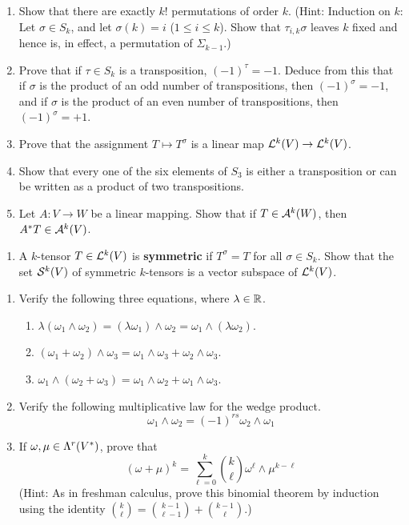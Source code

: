 \documentclass[../psets.tex]{subfiles}
\begin{document}
\begin{enumerate}[label={\textbf{1.4.\roman*.}}]
    \item Show that there are exactly $k!$ permutations of order $k$. (Hint: Induction on $k$: Let $\sigma\in S_k$, and let $\sigma(k)=i$ ($1\leq i\leq k$). Show that $\tau_{i,k}\sigma$ leaves $k$ fixed and hence is, in effect, a permutation of $\Sigma_{k-1}$.)
    \item Prove that if $\tau\in S_k$ is a transposition, $(-1)^\tau=-1$. Deduce from this that if $\sigma$ is the product of an odd number of transpositions, then $(-1)^\sigma=-1$, and if $\sigma$ is the product of an even number of transpositions, then $(-1)^\sigma=+1$.
    \item Prove that the assignment $T\mapsto T^\sigma$ is a linear map $\lin[k]{V}\to\lin[k]{V}$.
    \setcounter{enumi}{5}
    \item Show that every one of the six elements of $S_3$ is either a transposition or can be written as a product of two transpositions.
    \setcounter{enumi}{8}
    \item Let $A:V\to W$ be a linear mapping. Show that if $T\in\alt[k]{W}$, then $A^*T\in\alt[k]{V}$.
\end{enumerate}
\begin{enumerate}[label={\textbf{1.5.\roman*.}}]
    \item A $k$-tensor $T\in\lin[k]{V}$ is \textbf{symmetric} if $T^\sigma=T$ for all $\sigma\in S_k$. Show that the set $\sym[k]{V}$ of symmetric $k$-tensors is a vector subspace of $\lin[k]{V}$.
\end{enumerate}
\begin{enumerate}[label={\textbf{1.6.\roman*.}}]
    \item Verify the following three equations, where $\lambda\in\R$.
    \begin{enumerate}
        \item $\lambda(\omega_1\wedge\omega_2)=(\lambda\omega_1)\wedge\omega_2=\omega_1\wedge(\lambda\omega_2)$.
        \item $(\omega_1+\omega_2)\wedge\omega_3=\omega_1\wedge\omega_3+\omega_2\wedge\omega_3$.
        \item $\omega_1\wedge(\omega_2+\omega_3)=\omega_1\wedge\omega_2+\omega_1\wedge\omega_3$.
    \end{enumerate}
    \item Verify the following multiplicative law for the wedge product.
    \begin{equation*}
        \omega_1\wedge\omega_2 = (-1)^{rs}\omega_2\wedge\omega_1
    \end{equation*}
    \item If $\omega,\mu\in\lam[r]{V^*}$, prove that
    \begin{equation*}
        (\omega+\mu)^k = \sum_{\ell=0}^k\binom{k}{\ell}\omega^\ell\wedge\mu^{k-\ell}
    \end{equation*}
    (Hint: As in freshman calculus, prove this binomial theorem by induction using the identity $\binom{k}{\ell}=\binom{k-1}{\ell-1}+\binom{k-1}{\ell}$.)
\end{enumerate}
\end{document}
